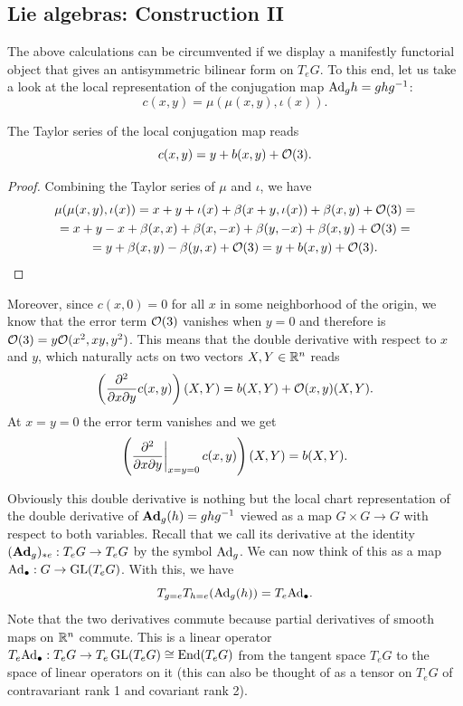 \subsection{Lie algebras: Construction II}

The above calculations can be circumvented if we display a manifestly functorial object that gives an antisymmetric bilinear form on $T_eG$. To this end, let us take a look at the local representation of the conjugation map $\mathrm{Ad}_g h=ghg^{-1}$:
\[c(x,y)=\mu(\mu(x,y),\iota(x)).\]

\begin{lem}
    The Taylor series of the local conjugation map reads
    \[c(x,y)=y+b(x,y)+\mathcal{O}(3).\]
\end{lem}
\begin{proof}
Combining the Taylor series of $\mu$ and $\iota$, we have
    \begin{multline}
        \mu(\mu(x,y),\iota(x))= x+y+\iota(x)+\beta(x+y,\iota(x)) +\beta(x,y)+\mathcal{O}(3)=\\
        =x+y-x+\beta(x,x)+\beta(x,-x)+ \beta(y,-x)+ \beta(x,y)+\mathcal{O}(3)=\\
        =y+\beta(x,y)-\beta(y,x) +\mathcal{O}(3)=y+b(x,y)+\mathcal{O}(3).
    \end{multline}
\end{proof}

Moreover, since $c(x,0)=0$ for all $x$ in some neighborhood of the origin, we know that the error term $\mathcal{O}(3)$ vanishes when $y=0$ and therefore is $\mathcal{O}(3)=y\mathcal{O}(x^2,xy,y^2)$. This means that the double derivative with respect to $x$ and $y$, which naturally acts on two vectors $X,Y\in\mathbb{R}^n$ reads
\[\left(\frac{\partial^2}{\partial x\partial y}c(x,y)\right)(X,Y)=b(X,Y)+\mathcal{O}(x,y)(X,Y).\]
At $x=y=0$ the error term vanishes and we get
\[\left(\restr{\frac{\partial^2}{\partial x\partial y}}{x=y=0}c(x,y)\right)(X,Y)=b(X,Y).\]

Obviously this double derivative is nothing but the local chart representation of the double derivative of $\mathrm{\mathbf{Ad}}_g(h)= ghg^{-1}$ viewed as a map $G\times G\to G$ with respect to both variables. Recall that we call its derivative at the identity $(\mathrm{\mathbf{Ad}}_g)_{\ast e}:T_eG\to T_e G$ by the symbol $\mathrm{Ad}_g$. We can now think of this as a map $\mathrm{Ad}_\bullet:G\to \operatorname{GL}(T_e G)$. With this, we have
\[T_{g=e}T_{h=e}(\mathrm{Ad}_g(h))=T_e \mathrm{Ad}_\bullet.\]
Note that the two derivatives commute because partial derivatives of smooth maps on $\mathbb{R}^n$ commute. This is a linear operator $T_e \mathrm{Ad}_\bullet:T_eG\to T_e\operatorname{GL}(T_e G)\cong \operatorname{End}(T_eG)$ from the tangent space $T_e G$ to the space of linear operators on it (this can also be thought of as a tensor on $T_e G$ of contravariant rank 1 and covariant rank 2).

